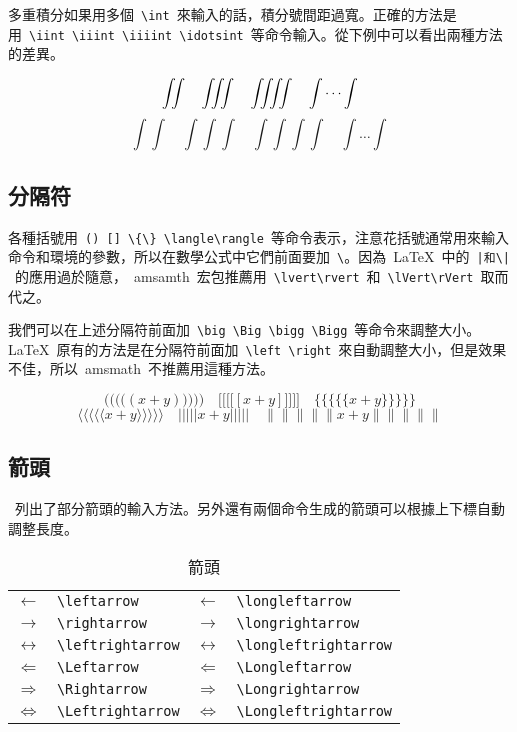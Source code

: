 多重積分如果用多個~\verb|\int|~來輸入的話，積分號間距過寬。正確的方法是用~\verb|\iint \iiint \iiiint \idotsint|~等命令輸入。從下例中可以看出兩種方法的差異。

\begin{out}
\[\iint\quad \iiint\quad \iiiint\quad \idotsint\]
\[\int\int\quad \int\int\int\quad \int\int\int\int\quad \int\dots\int\]
\end{out}

\subsection{分隔符}
各種括號用~\verb|() [] \{\} \langle\rangle|~等命令表示，注意花括號通常用來輸入命令和環境的參數，所以在數學公式中它們前面要加~\verb|\|。因為~\LaTeX~中的~\verb+|和\|+~的應用過於隨意，~amsamth~宏包推薦用~\verb|\lvert\rvert|~和~\verb|\lVert\rVert|~取而代之。

我們可以在上述分隔符前面加~\verb|\big \Big \bigg \Bigg|~等命令來調整大小。\LaTeX~原有的方法是在分隔符前面加~\verb|\left \right|~來自動調整大小，但是效果不佳，所以~amsmath~不推薦用這種方法。

\begin{out}
\[\Bigg(\bigg(\Big(\big((x+y)\big)\Big)\bigg)\Bigg)\quad 
\Bigg[\bigg[\Big[\big[[x+y]\big]\Big]\bigg]\Bigg]\quad 
\Bigg\{\bigg\{\Big\{\big\{\{x+y\}\big\}\Big\}\bigg\}\Bigg\}\]
\[\Bigg\langle\bigg\langle\Big\langle\big\langle\langle x+y \rangle\big\rangle\Big\rangle\bigg\rangle\Bigg\rangle\quad
\Bigg\lvert\bigg\lvert\Big\lvert\big\lvert\lvert x+y \rvert\big\rvert\Big\rvert\bigg\rvert\Bigg\rvert\quad
\Bigg\lVert\bigg\lVert\Big\lVert\big\lVert\lVert x+y \rVert\big\rVert\Big\rVert\bigg\rVert\Bigg\rVert\]
\end{out}

\subsection{箭頭}
~列出了部分箭頭的輸入方法。另外還有兩個命令生成的箭頭可以根據上下標自動調整長度。

\begin{table}[htbp]
\caption{箭頭}
\label{tab:arrow}
\centering
\begin{tabular}{llll}
    \toprule
    $\leftarrow$       & \verb|\leftarrow|      & $\longleftarrow$       & \verb|\longleftarrow| \\
    $\rightarrow$      & \verb|\rightarrow|     & $\longrightarrow$      & \verb|\longrightarrow| \\
    $\leftrightarrow$  & \verb|\leftrightarrow| & $\longleftrightarrow$  & \verb|\longleftrightarrow| \\
    $\Leftarrow$       & \verb|\Leftarrow|      & $\Longleftarrow$       & \verb|\Longleftarrow| \\
    $\Rightarrow$      & \verb|\Rightarrow|     & $\Longrightarrow$      & \verb|\Longrightarrow| \\
    $\Leftrightarrow$  & \verb|\Leftrightarrow| & $\Longleftrightarrow$  & \verb|\Longleftrightarrow| \\
    \bottomrule
\end{tabular}
\end{table}

